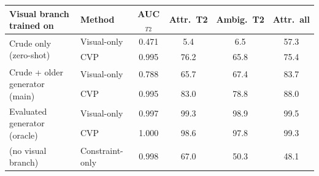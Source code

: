 \begin{tabular}{llcccc}
\toprule
Visual branch trained on & Method & AUC$_{T2}$ & Attr.\ T2 & Ambig.\ T2 & Attr.\ all\\
\midrule
\multirow{2}{*}{Crude only (zero-shot)} & Visual-only & 0.471 & 5.4 & 6.5 & 57.3\\
 & CVP & 0.995 & 76.2 & 65.8 & 75.4\\
\midrule
\multirow{2}{*}{Crude + older generator (main)} & Visual-only & 0.788 & 65.7 & 67.4 & 83.7\\
 & CVP & 0.995 & 83.0 & 78.8 & 88.0\\
\midrule
\multirow{2}{*}{Evaluated generator (oracle)} & Visual-only & 0.997 & 99.3 & 98.9 & 99.5\\
 & CVP & 1.000 & 98.6 & 97.8 & 99.3\\
\midrule
(no visual branch) & Constraint-only & 0.998 & 67.0 & 50.3 & 48.1\\
\bottomrule
\end{tabular}
